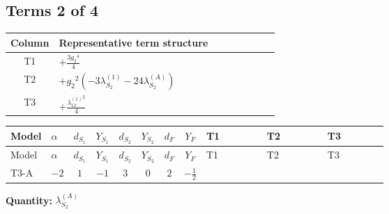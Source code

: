 \documentclass[8pt]{article}
\begin{document}
\begin{landscape}
\subsection*{Terms 2 of 4}
\begin{center}
\begin{tabular}{@{}c >{\raggedright\arraybackslash}p{0.82\linewidth}@{}}
\toprule
Column & Representative term structure \\
\midrule
T1 & \(\displaystyle +\frac{3 {g_2}^4}{4}\) \\
\midrule
T2 & \(\displaystyle +{g_2}^2 (-3 {\lambda_{S_2}^{(1)}}-24 {\lambda_{S_2}^{(A)}})\) \\
\midrule
T3 & \(\displaystyle +\frac{{\lambda_{12}^{(1)}}^2}{4}\) \\
\midrule
\bottomrule
\end{tabular}
\end{center}
\smallskip
\tiny
\begin{longtable}{@{}llcccccc >{\raggedright\arraybackslash}p{0.21\linewidth} >{\raggedright\arraybackslash}p{0.21\linewidth} >{\raggedright\arraybackslash}p{0.21\linewidth}@{}}
\toprule
Model & $\alpha$ & $d_{S_1}$ & $Y_{S_1}$ & $d_{S_2}$ & $Y_{S_2}$ & $d_F$ & $Y_F$ & T1 & T2 & T3 \\
\midrule
\endfirsthead
\toprule
Model & $\alpha$ & $d_{S_1}$ & $Y_{S_1}$ & $d_{S_2}$ & $Y_{S_2}$ & $d_F$ & $Y_F$ & T1 & T2 & T3 \\
\midrule
\endhead
T3-A & $-2$ & $1$ & $-1$ & $3$ & $0$ & $2$ & $-\frac{1}{2}$ & \scriptsize\adjustbox{max width=\linewidth}{$\begin{gathered} +\frac{3 {g_2}^4}{4}\end{gathered}$} & \scriptsize\adjustbox{max width=\linewidth}{$\begin{gathered} +{g_2}^2 (-3 {\lambda_{S_2}^{(1)}}-24 {\lambda_{S_2}^{(A)}})\end{gathered}$} & \scriptsize\adjustbox{max width=\linewidth}{$\begin{gathered} +\frac{{\lambda_{12}^{(1)}}^2}{4}\end{gathered}$} \\
\midrule
\bottomrule
\end{longtable}
\clearpage
\noindent\textbf{Quantity: }$\lambda_{S_2}^{(A)}$\par\smallskip

\end{landscape}
\end{document}

